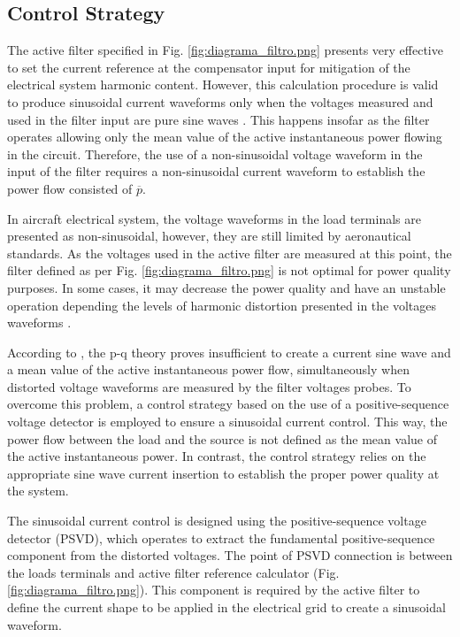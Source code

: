 
\subsection{Control Strategy}

The active filter specified in Fig. \ref{fig:diagrama_filtro.png} presents very effective to set the current reference at the compensator input for mitigation of the electrical system harmonic content. However, this calculation procedure is valid to produce sinusoidal current waveforms only when the voltages measured and used in the filter input are pure sine waves \citep{Akagi2007}. This happens insofar as the filter operates allowing only the mean value of the active instantaneous power flowing in the circuit. Therefore, the use of a non-sinusoidal voltage waveform in the input of the filter requires a non-sinusoidal current waveform to establish the power flow consisted of $\overline{p}$.

In aircraft electrical system, the voltage waveforms in the load terminals are presented as non-sinusoidal, however, they are still limited by aeronautical standards. As the voltages used in the active filter are measured at this point, the filter defined as per Fig. \ref{fig:diagrama_filtro.png} is not optimal for power quality purposes. In some cases, it may decrease the power quality and have an unstable operation depending the levels of harmonic distortion presented in the voltages waveforms \citep{Akagi2007}.

According to \citep{Akagi2007}, the p-q theory proves insufficient to create a current sine wave and a mean value of the active instantaneous power flow, simultaneously when distorted voltage waveforms are measured by the filter voltages probes. To overcome this problem, a control strategy based on the use of a positive-sequence voltage detector is employed to ensure a sinusoidal current control. This way, the power flow between the load and the source is not defined as the mean value of the active instantaneous power. In contrast, the control strategy relies on the appropriate sine wave current insertion to establish the proper power quality at the system.

The sinusoidal current control is designed using the positive-sequence voltage detector (PSVD), which operates to extract the fundamental positive-sequence component from the distorted voltages. The point of PSVD connection is between the loads terminals and active filter reference calculator (Fig. \ref{fig:diagrama_filtro.png}). This component is required by the active filter to define the current shape to be applied in the electrical grid to create a sinusoidal waveform. 

